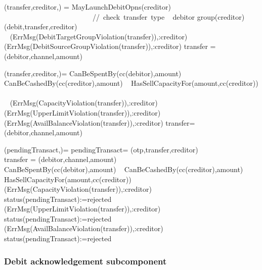   \begin{asm}
 (transfer,creditor,)  =\+
 \IF MayLaunchDebitOpns(creditor) 
 \mbox{~~~~~~~~~~~~~~~~~~~~~~~~  // check transfer type}\+
 \THEN ~ \IF debitor \in group(creditor) \+
 \THEN  ~ (debit,transfer,creditor) \\
 \ELSE ~ 
 (ErrMsg(DebitTargetGroupViolation(transfer)),\TO :creditor) \- 
 \ELSE ~ 
 (ErrMsg(DebitSourceGroupViolation(transfer)),\TO :creditor)\-
 \WHERE \+
 transfer = (debitor,channel,amount) 
 \end{asm}
 
 \begin{asm}
 (transfer,creditor,)=\+
 \IF CanBeSpentBy(cc(debitor),amount) \+
 \THEN ~ \IF CanBeCashedBy(cc(creditor),amount) \+
 \THEN ~ \IF HasSellCapacityFor(amount,cc(creditor)) \+
 \THEN ~ \\
 \ELSE 
 ~ (ErrMsg(CapacityViolation(transfer)),\TO :creditor)\-
 \ELSE 
 ~ (ErrMsg(UpperLimitViolation(transfer)),\TO :creditor)\-
 \ELSE 
 ~ (ErrMsg(AvailBalanceViolation(transfer)),\TO :creditor)\dec\-
 \WHERE \+
 transfer=(debitor,channel,amount)
 \end{asm}
 
  
 \begin{asm}
 (pendingTransact,)=\+
 \LET pendingTransact= (otp,transfer,creditor)\\
 \LET transfer = (debitor,channel,amount)\\
 \IF CanBeSpentBy(cc(debitor),amount) \+
 \THEN ~ \IF CanBeCashedBy(cc(creditor),amount) \+
 \THEN ~ \IF HasSellCapacityFor(amount,cc(creditor)) \+
 \THEN ~  \\
 \ELSE \+
 (ErrMsg(CapacityViolation(transfer)),\TO :creditor)\\
 status(pendingTransact):=rejected \dec\-
 \ELSE \+
 (ErrMsg(UpperLimitViolation(transfer)),\TO :creditor)\\
 status(pendingTransact):=rejected \dec\-
 \ELSE \+
 (ErrMsg(AvailBalanceViolation(transfer)),\TO :creditor)\\
 status(pendingTransact):=rejected
 \end{asm}
 
 \subsubsection{Debit acknowledgement subcomponent}
 
